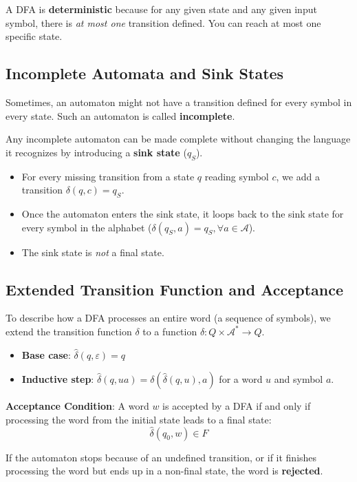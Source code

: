A DFA is \textbf{deterministic} because for any given state and any given input symbol, there is \emph{at most one} transition defined. You can reach at most one specific state.

\subsection{Incomplete Automata and Sink States}

Sometimes, an automaton might not have a transition defined for every symbol in every state. Such an automaton is called \textbf{incomplete}. 

Any incomplete automaton can be made complete without changing the language it recognizes by introducing a \textbf{sink state} ($q_S$). 
\begin{itemize}
\item For every missing transition from a state $q$ reading symbol $c$, we add a transition $\delta(q, c) = q_S$.
\item Once the automaton enters the sink state, it loops back to the sink state for every symbol in the alphabet ($\delta(q_S, a) = q_S, \forall a \in \mathcal{A}$).
\item The sink state is \emph{not} a final state.
\end{itemize}

\subsection{Extended Transition Function and Acceptance}

To describe how a DFA processes an entire word (a sequence of symbols), we extend the transition function $\delta$ to a function $\hat{\delta}: Q \times \mathcal{A}^* \rightarrow Q$.
\begin{itemize}
\item \textbf{Base case}: $\hat{\delta}(q, \varepsilon) = q$
\item \textbf{Inductive step}: $\hat{\delta}(q, ua) = \delta(\hat{\delta}(q, u), a)$ for a word $u$ and symbol $a$.
\end{itemize}

\textbf{Acceptance Condition}: 
A word $w$ is accepted by a DFA if and only if processing the word from the initial state leads to a final state:
$$ \hat{\delta}(q_0, w) \in F $$

If the automaton stops because of an undefined transition, or if it finishes processing the word but ends up in a non-final state, the word is \textbf{rejected}.

